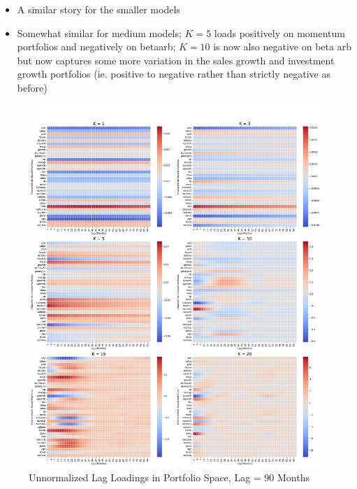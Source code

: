\documentclass{article}
\begin{document}
\begin{itemize}
    \item A similar story for the smaller models
    \item Somewhat similar for medium models; $K = 5$ loads positively on momentum portfolios and negatively on betaarb; 
    $K = 10$ is now also negative on beta arb but now captures some more variation in the sales growth 
    and investment growth portfolios (ie. positive to negative rather than strictly negative as before)
\end{itemize}

\begin{figure}[H]
    \centering
    \includegraphics[width=1\linewidth]{WB_90_unnorm.png}
    \caption{Unnormalized Lag Loadings in Portfolio Space, Lag = 90 Months}
    \label{fig:WB_90}
\end{figure}
\end{document}
